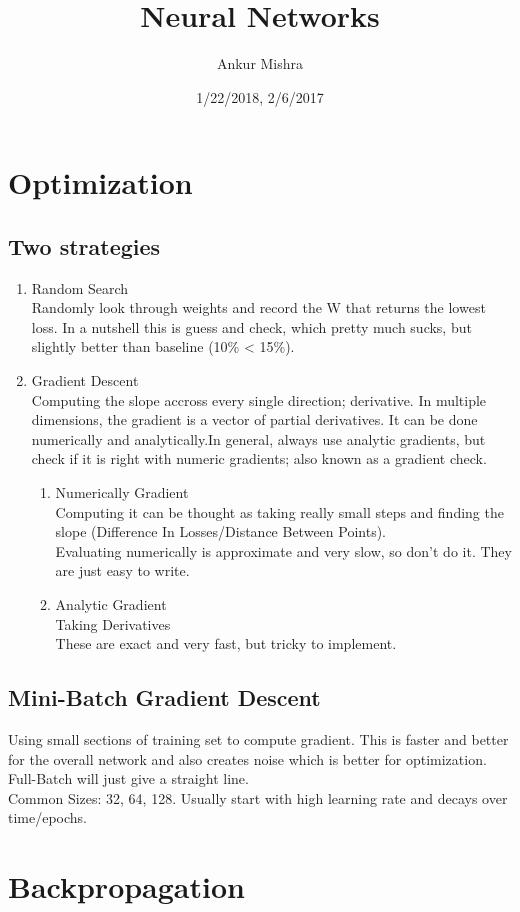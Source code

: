 \documentclass[11pt]{article}
\author{Ankur Mishra}
\date{1/22/2018, 2/6/2017}
\title{Neural Networks}
\begin{document}
\maketitle
\tableofcontents

\section{Optimization}
\label{sec-1}
\subsection{Two strategies}
\label{sec-1-1}
\begin{enumerate}
\item Random Search\\
\label{sec-1-1-0-1}
Randomly look through weights and record the W that returns the lowest loss. In a nutshell this is
guess and check, which pretty much sucks, but slightly better than baseline (10\% < 15\%).
\item Gradient Descent\\
\label{sec-1-1-0-2}
Computing the slope accross every single direction; derivative. In multiple dimensions, the gradient is a vector of
partial derivatives. It can be done numerically and analytically.In general, always use analytic gradients, but check if it is right with numeric gradients; also known as
a gradient check. 
\begin{enumerate}
\item Numerically Gradient\\
\label{sec-1-1-0-2-1}
Computing it can be thought as taking really small steps and finding the slope (Difference In Losses/Distance Between Points).\\
Evaluating numerically is approximate and very slow, so don't do it. They are just easy to write.
\item Analytic Gradient\\
\label{sec-1-1-0-2-2}
Taking Derivatives \\
These are exact and very fast, but tricky to implement.\\
\end{enumerate}
\end{enumerate}
\subsection{Mini-Batch Gradient Descent}
\label{sec-1-2}
Using small sections of training set to compute gradient. This is faster and better for the overall network 
and also creates noise which is better for optimization. Full-Batch will just give a straight line.\\
Common Sizes: 32, 64, 128.
Usually start with high learning rate and decays over time/epochs.
\section{Backpropagation}
\label{sec-2}
\end{document}
